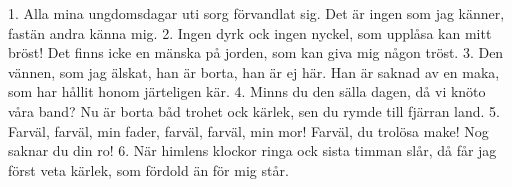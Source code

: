 1.  Alla mina ungdomsdagar
    uti sorg förvandlat sig.
    Det är ingen som jag känner,
    fastän andra känna mig.
2.  Ingen dyrk ock ingen nyckel,
    som upplåsa kan mitt bröst!
    Det finns icke en mänska på jorden,
    som kan giva mig någon tröst.
3.  Den vännen, som jag älskat,
    han är borta, han är ej här.
    Han är saknad av en maka,
    som har hållit honom järteligen kär.
4.  Minns du den sälla dagen,
    då vi knöto våra band?
    Nu är borta båd trohet ock kärlek,
    sen du rymde till fjärran land.
5.  Farväl, farväl, min fader,
    farväl, farväl, min mor!
    Farväl, du trolösa make!
    Nog saknar du din ro!
6.  När himlens klockor ringa
    ock sista timman slår,
    då får jag först veta kärlek,
    som fördold än för mig står.
